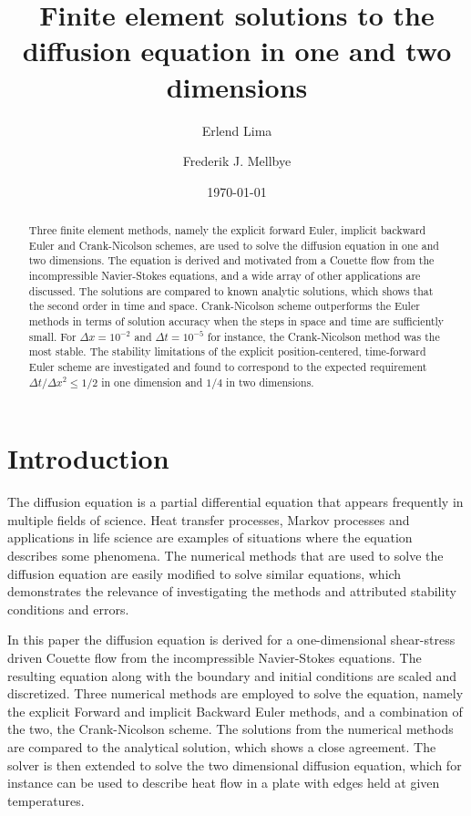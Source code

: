 \documentclass[aps,reprint]{revtex4-1}
\begin{document}
\title{Finite element solutions to the diffusion equation in one and two dimensions}
\author{Erlend Lima}
\author{Frederik J. Mellbye}
\date{\today}

\begin{abstract}
Three finite element methods, namely the explicit forward Euler, implicit backward Euler
and Crank-Nicolson schemes, are used to solve the diffusion equation in one and
two dimensions. The equation is derived and motivated from a Couette flow from the
incompressible Navier-Stokes equations, and a wide array of other applications
are discussed. The solutions are compared to known analytic solutions, which shows
that the second order in time and space. Crank-Nicolson scheme outperforms
the Euler methods in terms of solution accuracy when the steps in space and time are sufficiently small. For $\Delta x = 10^{-2}$ and $\Delta{t} = 10^{-5}$ for instance,
the Crank-Nicolson method was the most stable. The stability limitations of the
explicit position-centered, time-forward Euler scheme are investigated and found to
correspond to the expected requirement $\Delta{t}/\Delta{x}^2 \leq 1/2$ in one dimension
and $1/4$ in two dimensions.
\end{abstract}
\maketitle
\tableofcontents
\makeatletter
\let\toc@pre\relax
\let\toc@post\relax
\makeatother

\newpage

\section{Introduction} \label{sec:introduction}
The diffusion equation is a partial differential equation that appears frequently in
multiple fields of science. Heat transfer processes, Markov processes
and applications in life science are examples of situations where the equation describes
some phenomena. The numerical methods that are used to solve the diffusion
equation are easily modified to solve similar equations, which demonstrates the relevance
of investigating the methods and attributed stability conditions and errors.

In this paper the diffusion equation is derived for a one-dimensional shear-stress
driven Couette flow from the incompressible Navier-Stokes equations. The resulting
equation along with the boundary and initial conditions are scaled and discretized.
Three numerical methods are employed to solve the equation, namely the explicit Forward and
implicit Backward Euler methods, and a combination of the two, the Crank-Nicolson scheme.
The solutions from the numerical methods are compared to the analytical solution, which
shows a close agreement. The solver is then extended to solve the two dimensional
diffusion equation, which for instance can be used to describe heat flow in a
plate with edges held at given temperatures.
\end{document}
